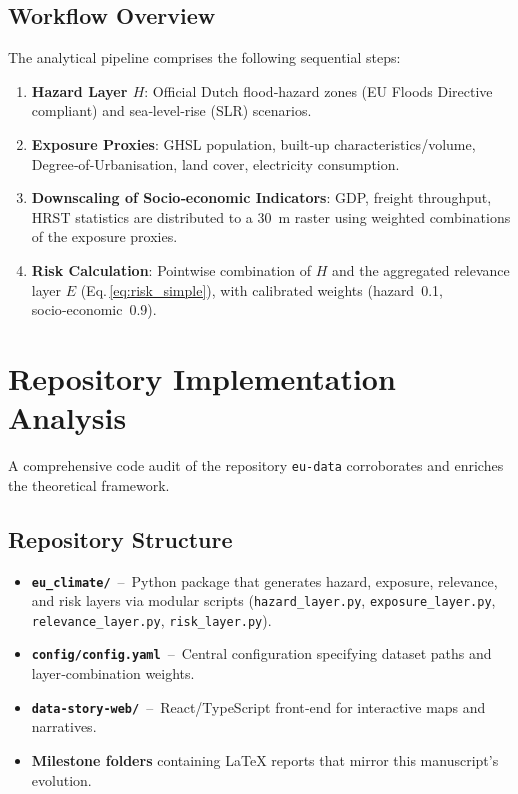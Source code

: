 \documentclass[a4paper,11pt]{article}
\begin{document}
\subsection{Workflow Overview}
The analytical pipeline comprises the following sequential steps:
\begin{enumerate}[label=\arabic*.]
  \item \textbf{Hazard Layer $H$}: Official Dutch flood‑hazard zones (EU Floods Directive compliant) and sea‑level‑rise (SLR) scenarios.
  \item \textbf{Exposure Proxies}: GHSL population, built‑up characteristics/volume, Degree‑of‑Urbanisation, land cover, electricity consumption.
  \item \textbf{Downscaling of Socio‑economic Indicators}: GDP, freight throughput, HRST statistics are distributed to a \SI{30}{m} raster using weighted combinations of the exposure proxies.
  \item \textbf{Risk Calculation}: Pointwise combination of $H$ and the aggregated relevance layer $E$ (Eq.\,\ref{eq:risk_simple}), with calibrated weights (hazard 0.1, socio‑economic 0.9).
\end{enumerate}

\section{Repository Implementation Analysis}
A comprehensive code audit of the repository \texttt{eu-data} corroborates and enriches the theoretical framework.

\subsection{Repository Structure}
\begin{itemize}[leftmargin=*]
  \item \textbf{\texttt{eu\_climate/}} – Python package that generates hazard, exposure, relevance, and risk layers via modular scripts (\texttt{hazard\_layer.py}, \texttt{exposure\_layer.py}, \texttt{relevance\_layer.py}, \texttt{risk\_layer.py}).
  \item \textbf{\texttt{config/config.yaml}} – Central configuration specifying dataset paths and layer‑combination weights.
  \item \textbf{\texttt{data-story-web/}} – React/TypeScript front‑end for interactive maps and narratives.
  \item \textbf{Milestone folders} containing LaTeX reports that mirror this manuscript’s evolution.
\end{itemize}
\end{document}

